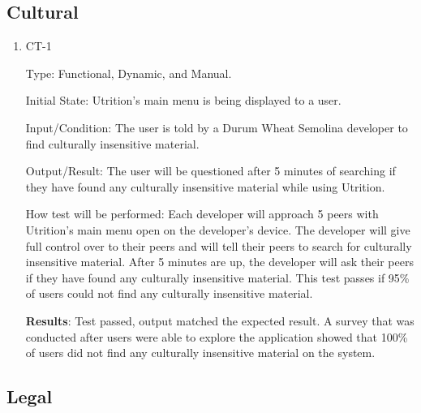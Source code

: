 \documentclass[12pt, titlepage]{article}
\begin{document}
	\subsection{Cultural}
	
	\begin{enumerate}
		\item{CT-1} 
		
		Type: Functional, Dynamic, and Manual.
		
		Initial State: Utrition’s main menu is being displayed to a user.
		
		Input/Condition: The user is told by a Durum Wheat Semolina developer to find culturally insensitive material.
		
		Output/Result: The user will be questioned after 5 minutes of searching if they have found any culturally insensitive material while using Utrition.
		
		How test will be performed: Each developer will approach 5 peers with Utrition’s main menu open on the developer’s device. The developer will give full control over to their peers and will tell their peers to search for culturally insensitive material. After 5 minutes are up, the developer will ask their peers if they have found any culturally insensitive material. This test passes if 95\% of users could not find any culturally insensitive material.
		
		\textbf{Results}: Test passed, output matched the expected result. A survey that was conducted after users were able to explore the application showed that 100\% of users did not find any culturally insensitive material on the system.
		
	\end{enumerate}

	\subsection{Legal}
	
\end{document}
